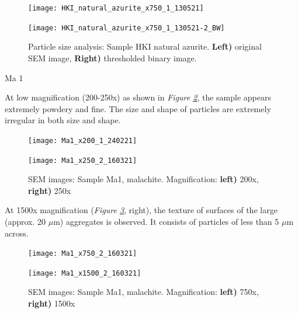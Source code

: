 \begin{figure}[H]
\centering
\begin{minipage}{.45\textwidth}
  \centering
  \texttt{[image: HKI\_natural\_azurite\_x750\_1\_130521]}
\end{minipage}
\begin{minipage}{.45\textwidth}
  \centering
  \texttt{[image: HKI\_natural\_azurite\_x750\_1\_130521-2\_BW]}
\end{minipage}
\caption[Particle size analysis: Sample HKI natural azurite]{Particle size analysis: Sample HKI natural azurite. \textbf{Left)} original SEM image, \textbf{Right)} thresholded binary image.}
\label{fig:imageJ_hki}
\end{figure}


Ma 1

At low magnification (200-250x) as shown in \textit{Figure \ref{fig:Ma1_sem_1}}, the sample appears extremely powdery and fine. The size and shape of particles are extremely irregular in both size and shape. 

\begin{figure}[H]
\centering
\begin{minipage}{.45\textwidth}
  \centering
  \texttt{[image: Ma1\_x200\_1\_240221]}
\end{minipage}
\begin{minipage}{.45\textwidth}
  \centering
  \texttt{[image: Ma1\_x250\_2\_160321]}
\end{minipage}
\caption[SEM images: Sample Ma1, malachite]{SEM images: Sample Ma1, malachite. Magnification: \textbf{left)} 200x, \textbf{right)} 250x}
\label{fig:Ma1_sem_1}
\end{figure}

At 1500x magnification (\textit{Figure \ref{fig:Ma1_sem_2}}, right), the texture of surfaces of the large (approx. 20 $\mu$m) aggregates is observed. It consists of particles of less than 5 $\mu$m across. 

\begin{figure}[H]
\centering
\begin{minipage}{.45\textwidth}
  \centering
  \texttt{[image: Ma1\_x750\_2\_160321]}
\end{minipage}
\begin{minipage}{.45\textwidth}
  \centering
  \texttt{[image: Ma1\_x1500\_2\_160321]}
\end{minipage}
\caption[SEM images: Sample Ma1, malachite]{SEM images: Sample Ma1, malachite. Magnification: \textbf{left)} 750x, \textbf{right)} 1500x}
\label{fig:Ma1_sem_2}
\end{figure}

